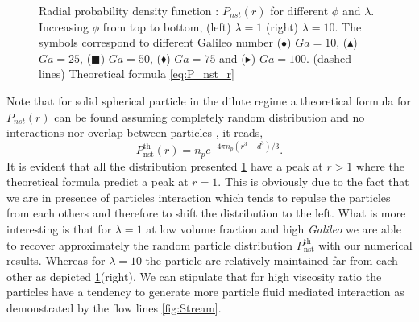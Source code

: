 \begin{figure}
    \caption{Radial probability density function : $P_{nst}(r)$ for different $\phi$ and $\lambda$. 
    Increasing $\phi$ from top to bottom, (left) $\lambda = 1$ (right) $\lambda = 10$. 
    The symbols correspond to different Galileo number ($\bullet$) $Ga = 10$, ($\blacktriangle$) $Ga = 25$, ($\blacksquare$) $Ga = 50$, ($\blacklozenge$) $Ga = 75$ and ($\blacktriangleright$) $Ga = 100$.
    (dashed lines) Theoretical formula \ref{eq:P_nst_r}}
    \label{fig:P_nst_r}
\end{figure}
Note that for solid spherical particle in the dilute regime a theoretical formula for $P_{nst}(r)$ can be found assuming completely random distribution and no interactions nor overlap between particles \citep{zhang2021ensemble}, it reads, 
\begin{equation*}
    P_\text{nst}^\text{th}(r) = n_p e^{-4 \pi n_p (r^3 - d^3)/3}.
    \label{eq:P_nst_r}
\end{equation*}
It is evident that all the distribution presented \ref{fig:P_nst_r} have a peak at $r > 1$ where the theoretical formula  predict a peak at $r=1$. 
This is obviously due to the fact that we are in presence of particles interaction which tends to repulse the particles from each others and therefore to shift the distribution to the left. 
What is more interesting is that for $\lambda = 1$ at low volume fraction and high \textit{Galileo} we are able to recover approximately the random particle distribution $P_\text{nst}^\text{th}$ with our numerical results. 
Whereas for $\lambda = 10$ the particle are relatively maintained far from  each other as depicted \ref{fig:P_nst_r}(right). 
We can stipulate that for high viscosity ratio the particles have a tendency to generate more particle fluid mediated interaction as demonstrated by the flow lines \ref{fig:Stream}.